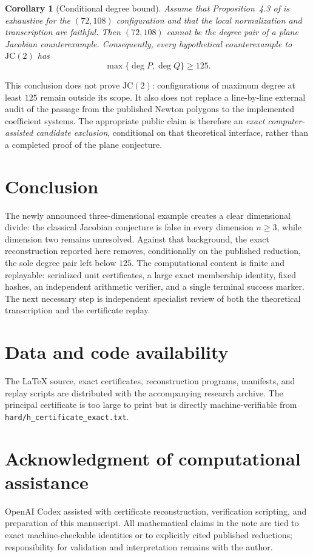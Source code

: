 \documentclass[11pt,a4paper]{article}
\newtheorem{corollary}[theorem]{Corollary}
\theoremstyle{remark}
\newcommand{\JC}{\mathrm{JC}}
\begin{document}
\begin{corollary}[Conditional degree bound]
Assume that Proposition~4.3 of \cite{GGHV2022} is exhaustive for the $(72,108)$ configuration and that the local normalization and transcription are faithful. Then $(72,108)$ cannot be the degree pair of a plane Jacobian counterexample. Consequently, every hypothetical counterexample to $\JC(2)$ has
\[
\max\{\deg P,\deg Q\}\geq125.
\]
\end{corollary}

This conclusion does not prove $\JC(2)$: configurations of maximum degree at least $125$ remain outside its scope. It also does not replace a line-by-line external audit of the passage from the published Newton polygons to the implemented coefficient systems. The appropriate public claim is therefore an \emph{exact computer-assisted candidate exclusion}, conditional on that theoretical interface, rather than a completed proof of the plane conjecture.

\section{Conclusion}

The newly announced three-dimensional example creates a clear dimensional divide: the classical Jacobian conjecture is false in every dimension $n\geq3$, while dimension two remains unresolved. Against that background, the exact reconstruction reported here removes, conditionally on the published reduction, the sole degree pair left below $125$. The computational content is finite and replayable: serialized unit certificates, a large exact membership identity, fixed hashes, an independent arithmetic verifier, and a single terminal success marker. The next necessary step is independent specialist review of both the theoretical transcription and the certificate replay.

\section*{Data and code availability}
The LaTeX source, exact certificates, reconstruction programs, manifests, and replay scripts are distributed with the accompanying research archive. The principal certificate is too large to print but is directly machine-verifiable from \texttt{hard/h\_certificate\_exact.txt}.

\section*{Acknowledgment of computational assistance}
OpenAI Codex assisted with certificate reconstruction, verification scripting, and preparation of this manuscript. All mathematical claims in the note are tied to exact machine-checkable identities or to explicitly cited published reductions; responsibility for validation and interpretation remains with the author.
\end{document}

